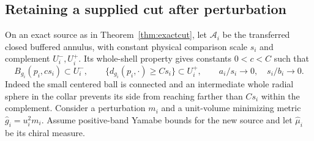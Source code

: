 \documentclass[11pt]{article}
\numberwithin{equation}{section}
\theoremstyle{definition}
\theoremstyle{remark}
\begin{document}
\subsection{Retaining a supplied cut after perturbation}

On an exact source as in Theorem~\ref{thm:exactcut}, let
\(\mathcal A_i\) be the transferred closed buffered
annulus, with constant physical comparison scale \(s_i\)
and complement \(U_i^-,U_i^+\). Its whole-shell property
gives constants \(0<c<C\) such that
\begin{equation}\label{eq:protected}
 B_{g_i}(p_i,c s_i)\subset U_i^-,\qquad
 \{d_{g_i}(p_i,\cdot)\ge C s_i\}\subset U_i^+,
 \qquad a_i/s_i\to0,\quad s_i/b_i\to0 .
\end{equation}
Indeed the small centered ball is connected and an
intermediate whole radial sphere in the collar prevents
its side from reaching farther than \(C s_i\) within the
complement. Consider a perturbation \(m_i\) and a
unit-volume minimizing metric \(\widehat g_i=u_i^2 m_i\).
Assume positive-band Yamabe bounds for the new source
and let \(\widehat \mu_i\) be its chiral measure.
\end{document}
